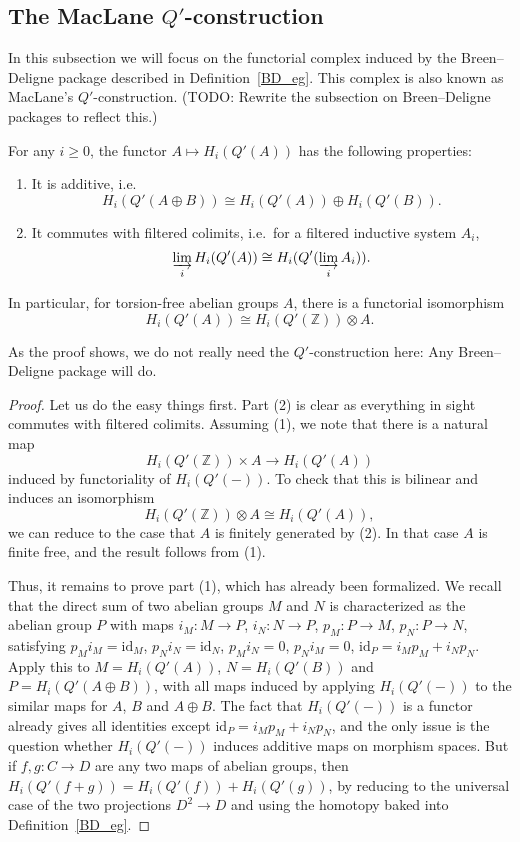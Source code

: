 \subsection{The MacLane $Q'$-construction}

In this subsection we will focus on the functorial complex induced by the Breen--Deligne package
described in Definition~\ref{BD_eg}.
This complex is also known as MacLane's $Q'$-construction.
(TODO: Rewrite the subsection on Breen--Deligne packages to reflect this.)

\begin{proposition}
  \label{homology-Qprime}
  For any $i\geq 0$, the functor $A\mapsto H_i(Q'(A))$ has the following properties:
  \begin{enumerate}
    \item It is additive, i.e.
      \[ H_i(Q'(A\oplus B))\cong H_i(Q'(A))\oplus H_i(Q'(B)).  \]
    \item It commutes with filtered colimits, i.e.~for a filtered inductive system $A_i$,
      \[ \varinjlim_i H_i(Q'(A))\cong H_i(Q'(\varinjlim_i A_i)). \]
  \end{enumerate}

  In particular, for torsion-free abelian groups $A$, there is a functorial isomorphism
  \[ H_i(Q'(A))\cong H_i(Q'(\mathbb Z))\otimes A.  \]
\end{proposition}

As the proof shows, we do not really need the $Q'$-construction here: Any Breen--Deligne package will do.

\begin{proof}
  Let us do the easy things first. Part (2) is clear as everything in sight commutes with filtered colimits.
  Assuming (1), we note that there is a natural map
  \[ H_i(Q'(\mathbb Z))\times A\to H_i(Q'(A)) \]
  induced by functoriality of $H_i(Q'(-))$. To check that this is bilinear and induces an isomorphism
  \[ H_i(Q'(\mathbb Z))\otimes A\cong H_i(Q'(A)), \]
  we can reduce to the case that $A$ is finitely generated by (2).
  In that case $A$ is finite free, and the result follows from (1).

  Thus, it remains to prove part (1), which has already been formalized.
  We recall that the direct sum of two abelian groups $M$ and $N$
  is characterized as the abelian group $P$ with maps $i_M: M\to P$, $i_N: N\to P$, $p_M: P\to M$, $p_N: P\to N$,
  satisfying $p_M i_M=\mathrm{id}_M$, $p_N i_N = \mathrm{id}_N$, $p_M i_N=0$, $p_N i_M = 0$, $\mathrm{id}_P = i_M p_M + i_N p_N$.
  Apply this to $M=H_i(Q'(A))$, $N=H_i(Q'(B))$ and $P=H_i(Q'(A\oplus B))$,
  with all maps induced by applying $H_i(Q'(-))$ to the similar maps for $A$, $B$ and $A\oplus B$.
  The fact that $H_i(Q'(-))$ is a functor already gives all identities except $\mathrm{id}_P = i_M p_M + i_N p_N$,
  and the only issue is the question whether $H_i(Q'(-))$ induces additive maps on morphism spaces.
  But if $f,g: C\to D$ are any two maps of abelian groups, then $H_i(Q'(f+g)) = H_i(Q'(f))+H_i(Q'(g))$,
  by reducing to the universal case of the two projections $D^2\to D$ and using the homotopy baked into Definition~\ref{BD_eg}.
\end{proof}

